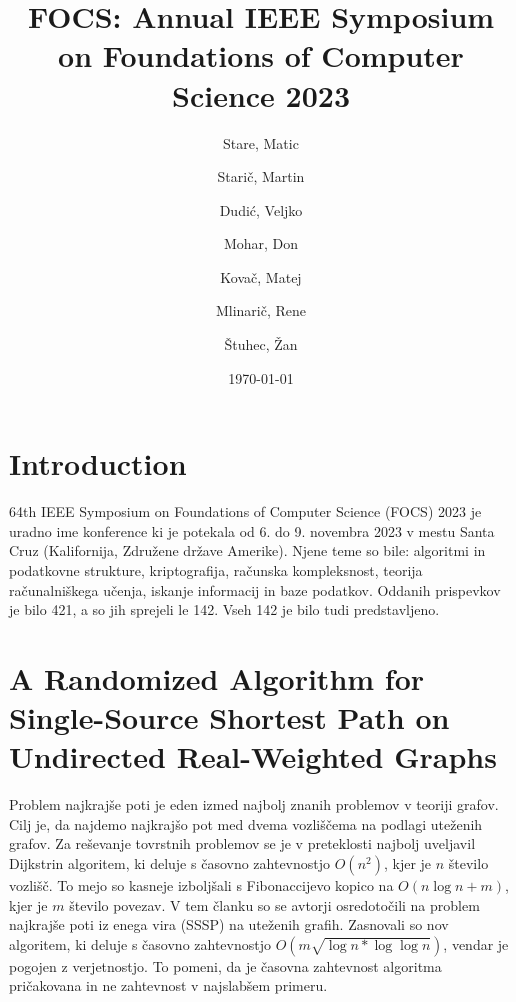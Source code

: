 \documentclass{article}
\title{FOCS: Annual IEEE Symposium on Foundations of Computer Science 2023}
\author{
  Stare, Matic\\
  \and
  Starič, Martin\\
  \and
  Dudić, Veljko\\
  \and
  Mohar, Don
  \and
  Kovač, Matej
  \and
  Mlinarič, Rene
  \and
  Štuhec, Žan
}
\date{\today}
\begin{document}
\maketitle

\tableofcontents
\newpage

\section{Introduction}
64th IEEE Symposium on Foundations of Computer Science (FOCS) 2023 je uradno ime konference ki je potekala od 6. do 9. novembra 2023 v mestu Santa Cruz (Kalifornija, Združene države Amerike). Njene teme so bile: algoritmi in podatkovne strukture, kriptografija, računska kompleksnost, teorija računalniškega učenja, iskanje informacij in baze podatkov. Oddanih prispevkov je bilo 421, a so jih sprejeli le 142. Vseh 142 je bilo tudi predstavljeno.

\section{A Randomized Algorithm for Single-Source Shortest Path on Undirected Real-Weighted Graphs}

Problem najkrajše poti je eden izmed najbolj znanih problemov v teoriji grafov. Cilj je, da najdemo najkrajšo pot med dvema vozliščema na podlagi uteženih grafov. Za reševanje tovrstnih problemov se je v preteklosti najbolj uveljavil Dijkstrin algoritem, ki deluje s časovno zahtevnostjo $O(n^2)$, kjer je $n$ število vozlišč. To mejo so kasneje izboljšali s Fibonaccijevo kopico na $O(n \log n + m)$, kjer je $m$ število povezav. V tem članku so se avtorji osredotočili na problem najkrajše poti iz enega vira (SSSP) na uteženih grafih. Zasnovali so nov algoritem, ki deluje s časovno zahtevnostjo $O(m \sqrt{\log n * \log \log n})$, vendar je pogojen z verjetnostjo. To pomeni, da je časovna zahtevnost algoritma pričakovana in ne zahtevnost v najslabšem primeru. 
\end{document}
